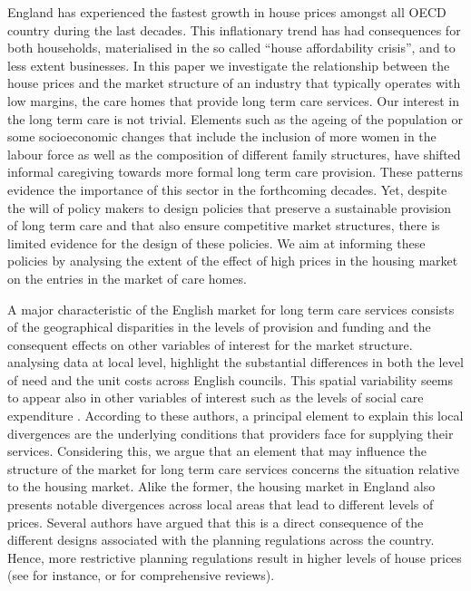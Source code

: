 \documentclass[12pt,letterpaper]{article}
\begin{document}
England has experienced the fastest growth in house prices amongst all OECD country during the last decades.
This inflationary trend has had consequences for both households, materialised in the so called “house affordability crisis”, 
and to less extent businesses. In this paper we investigate the relationship between the house prices 
and the market structure of an industry that typically operates with low margins, the care homes 
that provide long term care services. Our interest in the long term care is not trivial. Elements such as 
the ageing of the population or some socioeconomic changes that include the inclusion of more women 
in the labour force as well as the composition of different family structures, have shifted informal caregiving 
towards more formal long term care provision. These patterns evidence the importance of this sector in the 
forthcoming decades. Yet, despite the will of policy makers to design policies that preserve a sustainable 
provision of long term care and that also ensure competitive market structures, there is limited evidence for
 the design of these policies.  We aim at informing these policies by analysing the extent of the effect of high 
 prices in the housing market on the entries in the market of care homes. 

A major characteristic of the English market for long term care services consists of the geographical disparities
 in the levels of provision and funding and the consequent effects on other variables of interest for the market
 structure. \cite{forder2011} analysing data at local level, highlight the substantial differences in both 
 the level of need and the unit costs across English councils. This spatial variability seems to appear also in other
  variables of interest such as the levels of social care expenditure \citep{fernandez2015}. According 
  to these authors, a principal element to explain this local divergences are the underlying conditions that 
  providers face for supplying their services. Considering this, we argue that an element that may influence 
  the structure of the market for long term care services concerns the situation relative to the housing market. 
  Alike the former, the housing market in England also presents notable divergences across local areas that lead 
  to different levels of prices. Several authors have argued that this is a direct consequence of the different 
  designs associated with the planning regulations across the country. Hence, more restrictive planning 
  regulations result in higher levels of house prices (see for instance, \cite{cheshire2009} or \cite{hilber2016impact} for comprehensive reviews). 
\end{document}
